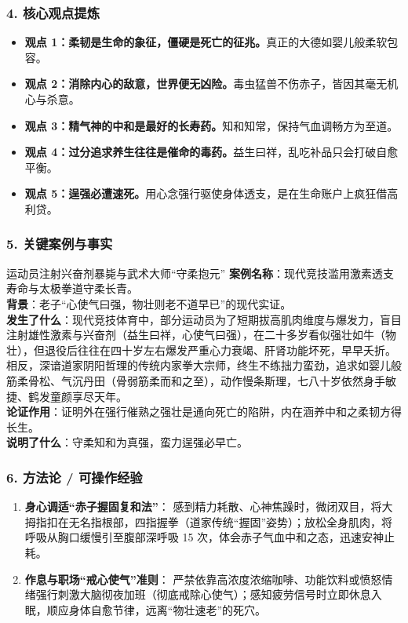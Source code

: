 \subsubsection{4. 核心观点提炼}
\begin{itemize}
    \item \textbf{观点 1：柔韧是生命的象征，僵硬是死亡的征兆。}真正的大德如婴儿般柔软包容。
    \item \textbf{观点 2：消除内心的敌意，世界便无凶险。}毒虫猛兽不伤赤子，皆因其毫无机心与杀意。
    \item \textbf{观点 3：精气神的中和是最好的长寿药。}知和知常，保持气血调畅方为至道。
    \item \textbf{观点 4：过分追求养生往往是催命的毒药。}益生曰祥，乱吃补品只会打破自愈平衡。
    \item \textbf{观点 5：逞强必遭速死。}用心念强行驱使身体透支，是在生命账户上疯狂借高利贷。
\end{itemize}

\subsubsection{5. 关键案例与事实}
\begin{CaseBox}{运动员注射兴奋剂暴毙与武术大师“守柔抱元”}
\textbf{案例名称}：现代竞技滥用激素透支寿命与太极拳道守柔长青。\\
\textbf{背景}：老子“心使气曰强，物壮则老不道早已”的现代实证。\\
\textbf{发生了什么}：现代竞技体育中，部分运动员为了短期拔高肌肉维度与爆发力，盲目注射雄性激素与兴奋剂（益生曰祥，心使气曰强），在二十多岁看似强壮如牛（物壮），但退役后往往在四十岁左右爆发严重心力衰竭、肝肾功能坏死，早早夭折。相反，深谙道家阴阳哲理的传统内家拳大宗师，终生不练拙力蛮劲，追求如婴儿般筋柔骨松、气沉丹田（骨弱筋柔而和之至），动作慢条斯理，七八十岁依然身手敏捷、鹤发童颜享尽天年。\\
\textbf{论证作用}：证明外在强行催熟之强壮是通向死亡的陷阱，内在涵养中和之柔韧方得长生。\\
\textbf{说明了什么}：守柔知和为真强，蛮力逞强必早亡。
\end{CaseBox}

\subsubsection{6. 方法论 / 可操作经验}
\begin{enumerate}
    \item \textbf{身心调适“赤子握固复和法”}：
    感到精力耗散、心神焦躁时，微闭双目，将大拇指扣在无名指根部，四指握拳（道家传统“握固”姿势）；放松全身肌肉，将呼吸从胸口缓慢引至腹部深呼吸 15 次，体会赤子气血中和之态，迅速安神止耗。
    \item \textbf{作息与职场“戒心使气”准则}：
    严禁依靠高浓度浓缩咖啡、功能饮料或愤怒情绪强行刺激大脑彻夜加班（彻底戒除心使气）；感知疲劳信号时立即休息入眠，顺应身体自愈节律，远离“物壮速老”的死穴。
\end{enumerate}

